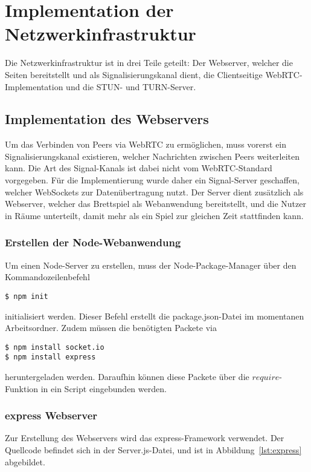 \section{Implementation der Netzwerkinfrastruktur}
Die Netzwerkinfrastruktur ist in drei Teile geteilt: Der Webserver, welcher die Seiten bereitstellt und als Signalisierungskanal dient, die Clientseitige WebRTC-Implementation und die \acs{STUN}- und \acs{TURN}-Server.

\subsection{Implementation des Webservers}
Um das Verbinden von Peers via WebRTC zu ermöglichen, muss vorerst ein Signalisierungskanal existieren, welcher Nachrichten zwischen Peers weiterleiten kann. Die Art des Signal-Kanals ist dabei nicht vom WebRTC-Standard vorgegeben. Für die Implementierung wurde daher ein Signal-Server geschaffen, welcher WebSockets zur Datenübertragung nutzt. Der Server dient zusätzlich als Webserver, welcher das Brettspiel als Webanwendung bereitstellt, und die Nutzer in \glqq{}Räume\grqq{} unterteilt, damit mehr als ein Spiel zur gleichen Zeit stattfinden kann.\par

\subsubsection{Erstellen der Node-Webanwendung}
Um einen Node-Server zu erstellen, muss der Node-Package-Manager über den Kommandozeilenbefehl

\lstset{style=STYLE_COMMAND_LINE_ARGUMENT_SINGLE_LINE}
\begin{lstlisting}[belowskip=-0.8 \baselineskip]
$ npm init
\end{lstlisting}

initialisiert werden. Dieser Befehl erstellt die \glqq{}package.json\grqq{}-Datei im momentanen Arbeitsordner. Zudem müssen die benötigten Packete via

\lstset{style=STYLE_COMMAND_LINE_ARGUMENT_SINGLE_LINE}
\begin{lstlisting}[belowskip=-0.8 \baselineskip]
$ npm install socket.io
$ npm install express
\end{lstlisting}

heruntergeladen werden. Daraufhin können diese Packete über die $require$-Funktion in ein Script eingebunden werden.

\subsubsection{express Webserver}
Zur Erstellung des Webservers wird das \glqq{}express\grqq{}-Framework verwendet. Der Quellcode befindet sich in der \glqq{}Server.js\grqq{}-Datei, und ist in Abbildung~\ref{lst:express} abgebildet.

